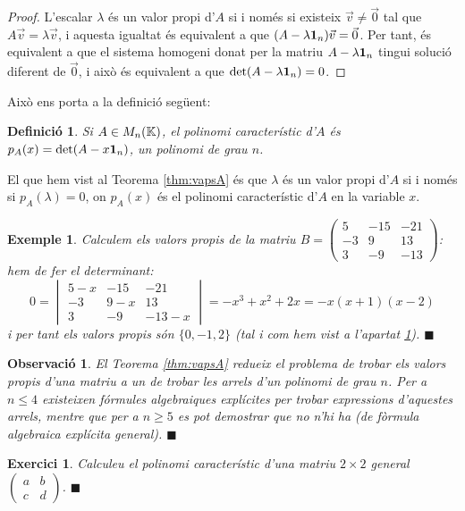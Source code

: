 \documentclass[
  11pt,
]{book}
\numberwithin{dummy}{section}
\theoremstyle{maincolornumbox}
\newtheorem{exerciseT}{Exercici}[chapter]
\newtheorem{remarkT}{Observació}[chapter]
\theoremstyle{blacknumex}
\newtheorem{exampleT}{Exemple}[chapter]
\theoremstyle{blacknumbox}
\newtheorem{definitionT}{Definició}[chapter]
\theoremstyle{maincolornum}
\newenvironment{exercise}{\begin{eBox}\begin{exerciseT}}{\hfill{\color{maincolor}\tiny\ensuremath{\blacksquare}}\end{exerciseT}\end{eBox}}
\newenvironment{definition}{\begin{dBox}\begin{definitionT}}{\end{definitionT}\end{dBox}}
\newenvironment{example}{\begin{exampleT}}{\hfill{\tiny\ensuremath{\blacksquare}}\end{exampleT}}
\newenvironment{remark}{\begin{remarkT}}{\hfill{\tiny\ensuremath{\blacksquare}}\end{remarkT}}
\begin{document}
\begin{proof}
L'escalar \(\lambda\) és un valor propi d'\(A\) si i només si
existeix \(\vec v\neq \vec 0\) tal que \(A\vec v=\lambda \vec v\), i aquesta
igualtat és equivalent a que \((A-\lambda \mathbf{1}_n)\vec v=\vec 0\). Per tant,
és equivalent a que el sistema homogeni donat per la matriu
\(A-\lambda\mathbf{1}_n\) tingui solució diferent de \(\vec 0\), i això és
equivalent a que \(\det(A-\lambda\mathbf{1}_n)=0\).
\end{proof}

Això ens porta a la definició següent:

\begin{definition}
Si \(A\in M_n(\mathbb{K})\), el \emph{polinomi característic d'\(A\)} és
\(p_A(x)=\det(A-x \mathbf{1}_n)\), un polinomi de grau \(n\).
\end{definition}

El que hem vist al Teorema
\ref{thm:vapsA}
és que \(\lambda\) és un valor propi d'\(A\) si i només si \(p_A(\lambda)=0\),
on \(p_A(x)\) és el polinomi característic d'\(A\) en la variable \(x\).

\begin{example}
Calculem els valors propis de la matriu \(B=\left(\begin{smallmatrix}
5 & -15 & -21 \\ -3 & 9 & 13 \\ 3 & -9 & -13
\end{smallmatrix}\right)\): hem de fer el determinant: \[0=
\begin{vmatrix}
5-x & -15 & -21 \\ -3 & 9-x & 13 \\ 3 & -9 & -13-x
\end{vmatrix} = -x^3 +x^2+2x=-x(x+1)(x-2)\] i per tant els valors propis
són \(\{0,-1,2\}\) (tal i com hem vist a l'apartat
\hyperref[subsec:motiv-diag]{1}).
\end{example}

\begin{remark}
El Teorema \ref{thm:vapsA} redueix el problema de trobar els valors propis
d'una matriu a un de trobar les arrels d'un polinomi de grau \(n\). Per a
\(n\leq 4\) existeixen fórmules algebraiques explícites per trobar
expressions d'aquestes arrels, mentre que per a \(n\geq 5\) es pot
demostrar que no n'hi ha (de fòrmula algebraica explícita general).
\end{remark}

\begin{exercise}
Calculeu el polinomi característic d'una matriu \(2\times 2\) general
\(\left(\begin{smallmatrix}a&b\\c&d\end{smallmatrix} \right)\).
\end{exercise}
\end{document}
